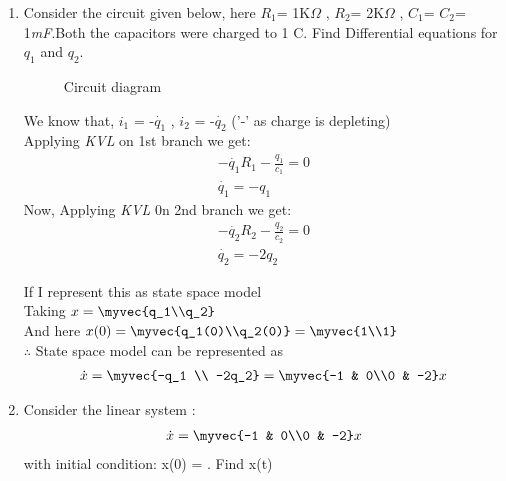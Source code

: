 \begin{enumerate}[label=\thesubsection.\arabic*.,ref=\thesubsection.\theenumi]

\item Consider the circuit given below, here $R_1$= 1K$\Omega$ , $R_2$= 2K$\Omega$ , $C_1$= $C_2$= 1\emph{mF}.Both the capacitors were charged to 1 C. Find Differential equations for $q_1$ and $q_2$.


\begin{figure}[!ht]
    \begin{center}
		
		\resizebox{\columnwidth}{!}{}
	\end{center}
\caption{Circuit diagram}
\label{fig:circuit_diagram}
\end{figure}

\solution We know that, $i_1$ = -$\dot{q_1}$ , $i_2$ = -$\dot{q_2}$   ('-' as charge is depleting)\\
Applying \emph{KVL} on 1st branch we get:
\begin{align}
    -\dot{q_1}R_1 - \frac{q_1}{c_1} = 0\\
    \dot{q_1} = -q_1
\end{align}
Now, Applying \emph{KVL} 0n 2nd branch we get:
\begin{align}
    -\dot{q_2}R_2 - \frac{q_2}{c_2} = 0\\
    \dot{q_2} = -2q_2
\end{align}

If I represent this as state space model\\
Taking $x = \myvec{q_1\\q_2}$\\
And here $x(0) = \myvec{q_1(0)\\q_2(0)} = \myvec{1\\1}$\\
$\therefore$ State space model can be represented as \\
\begin{align}
    \dot{x} = \myvec{-q_1 \\ -2q_2} = \myvec{-1 & 0\\0 & -2}x
\end{align}
\newline


\item  Consider the linear system :
\begin{align}
    \dot{x} = \myvec{-1 & 0\\0 & -2}x
\end{align}
with initial condition:  
x(0) = . Find x(t)



\end{enumerate}
